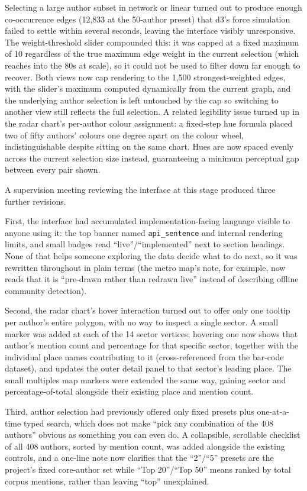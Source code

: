 \documentclass[logo,msc]{infthesis}
\begin{document}
Selecting a large author subset in network or linear turned out to produce enough co-occurrence edges (12,833 at the 50-author preset) that d3's force simulation failed to settle within several seconds, leaving the interface visibly unresponsive. The weight-threshold slider compounded this: it was capped at a fixed maximum of 10 regardless of the true maximum edge weight in the current selection (which reaches into the 80s at scale), so it could not be used to filter down far enough to recover. Both views now cap rendering to the 1,500 strongest-weighted edges, with the slider's maximum computed dynamically from the current graph, and the underlying author selection is left untouched by the cap so switching to another view still reflects the full selection. A related legibility issue turned up in the radar chart's per-author colour assignment: a fixed-step hue formula placed two of fifty authors' colours one degree apart on the colour wheel, indistinguishable despite sitting on the same chart. Hues are now spaced evenly across the current selection size instead, guaranteeing a minimum perceptual gap between every pair shown.

A supervision meeting reviewing the interface at this stage produced three further revisions.

First, the interface had accumulated implementation-facing language visible to anyone using it: the top banner named \texttt{api\_sentence} and internal rendering limits, and small badges read ``live''/``implemented'' next to section headings. None of that helps someone exploring the data decide what to do next, so it was rewritten throughout in plain terms (the metro map's note, for example, now reads that it is ``pre-drawn rather than redrawn live'' instead of describing offline community detection).

Second, the radar chart's hover interaction turned out to offer only one tooltip per author's entire polygon, with no way to inspect a single sector. A small marker was added at each of the 14 sector vertices; hovering one now shows that author's mention count and percentage for that specific sector, together with the individual place names contributing to it (cross-referenced from the bar-code dataset), and updates the outer detail panel to that sector's leading place. The small multiples map markers were extended the same way, gaining sector and percentage-of-total alongside their existing place and mention count.

Third, author selection had previously offered only fixed presets plus one-at-a-time typed search, which does not make ``pick any combination of the 408 authors'' obvious as something you can even do. A collapsible, scrollable checklist of all 408 authors, sorted by mention count, was added alongside the existing controls, and a one-line note now clarifies that the ``2''/``5'' presets are the project's fixed core-author set while ``Top 20''/``Top 50'' means ranked by total corpus mentions, rather than leaving ``top'' unexplained.
\end{document}
